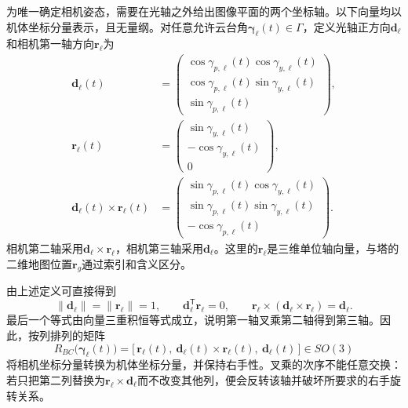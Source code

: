 为唯一确定相机姿态，需要在光轴之外给出图像平面的两个坐标轴。以下向量均以机体坐标分量表示，且无量纲。对任意允许云台角$\boldsymbol\gamma_\ell(t)\in\Gamma$，定义光轴正方向$\mathbf d_\ell$和相机第一轴方向$\mathbf r_\ell$为
\begin{subequations}
\label{s0404:camera_basis}
\begin{align}
 \mathbf d_\ell(t)
 &=\begin{pmatrix}
 \cos\gamma_{p,\ell}(t)\cos\gamma_{y,\ell}(t)\\
 \cos\gamma_{p,\ell}(t)\sin\gamma_{y,\ell}(t)\\
 \sin\gamma_{p,\ell}(t)
 \end{pmatrix},
 \label{s0404:optical_axis_body}\\
 \mathbf r_\ell(t)
 &=\begin{pmatrix}
 \sin\gamma_{y,\ell}(t)\\
 -\cos\gamma_{y,\ell}(t)\\
 0
 \end{pmatrix},
 \label{s0404:image_first_axis}\\
 \mathbf d_\ell(t)\times\mathbf r_\ell(t)
 &=\begin{pmatrix}
 \sin\gamma_{p,\ell}(t)\cos\gamma_{y,\ell}(t)\\
 \sin\gamma_{p,\ell}(t)\sin\gamma_{y,\ell}(t)\\
 -\cos\gamma_{p,\ell}(t)
 \end{pmatrix}.
 \label{s0404:image_second_axis}
\end{align}
\end{subequations}
相机第二轴采用$\mathbf d_\ell\times\mathbf r_\ell$，相机第三轴采用$\mathbf d_\ell$。这里的$\mathbf r_\ell$是三维单位轴向量，与塔的二维地图位置$\mathbf r_g$通过索引和含义区分。

由上述定义可直接得到
\begin{equation}
 \|\mathbf d_\ell\|=\|\mathbf r_\ell\|=1,
 \qquad \mathbf d_\ell^{\mathsf T}\mathbf r_\ell=0,
 \qquad
 \mathbf r_\ell\times(\mathbf d_\ell\times\mathbf r_\ell)
 =\mathbf d_\ell.
 \label{s0404:basis_handedness}
\end{equation}
最后一个等式由向量三重积恒等式成立，说明第一轴叉乘第二轴得到第三轴。因此，按列排列的矩阵
\begin{equation}
 R_{BC}\bigl(\boldsymbol\gamma_\ell(t)\bigr)
 =\bigl[\,\mathbf r_\ell(t),\
 \mathbf d_\ell(t)\times\mathbf r_\ell(t),\
 \mathbf d_\ell(t)\,\bigr]\in SO(3)
 \label{s0404:camera_to_body}
\end{equation}
将相机坐标分量转换为机体坐标分量，并保持右手性。叉乘的次序不能任意交换：若只把第二列替换为$\mathbf r_\ell\times\mathbf d_\ell$而不改变其他列，便会反转该轴并破坏所要求的右手旋转关系。


